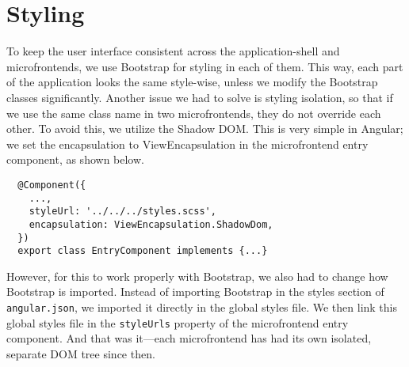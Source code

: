 \section{Styling}
To keep the user interface consistent across the application-shell and microfrontends, we use Bootstrap for styling in each of them. This way, each part of the application looks the same style-wise, unless we modify the Bootstrap classes significantly. Another issue we had to solve is styling isolation, so that if we use the same class name in two microfrontends, they do not override each other. To avoid this, we utilize the Shadow DOM. This is very simple in Angular; we set the encapsulation to ViewEncapsulation in the microfrontend entry component, as shown below.
\begin{verbatim}
  @Component({
    ...,
    styleUrl: '../../../styles.scss',
    encapsulation: ViewEncapsulation.ShadowDom,
  })
  export class EntryComponent implements {...}
\end{verbatim}
However, for this to work properly with Bootstrap, we also had to change how Bootstrap is imported. Instead of importing Bootstrap in the styles section of \texttt{angular.json}, we imported it directly in the global styles file. We then link this global styles file in the \texttt{styleUrls} property of the microfrontend entry component. And that was it—each microfrontend has had its own isolated, separate DOM tree since then.